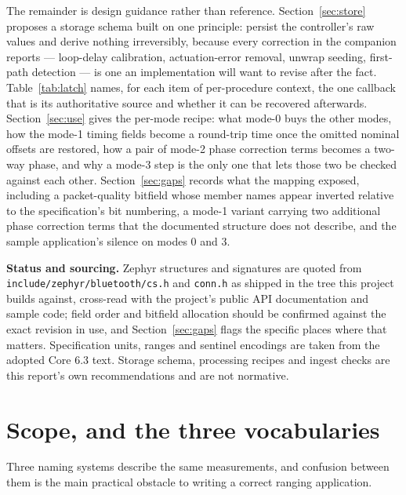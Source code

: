 \documentclass[11pt,a4paper]{article}
\newcommand{\code}[1]{\texttt{\small #1}}
\begin{document}
The remainder is design guidance rather than reference. Section~\ref{sec:store} proposes a storage
schema built on one principle: persist the controller's raw values and derive nothing irreversibly,
because every correction in the companion reports --- loop-delay calibration, actuation-error
removal, unwrap seeding, first-path detection --- is one an implementation will want to revise after
the fact. Table~\ref{tab:latch} names, for each item of per-procedure context, the one callback that
is its authoritative source and whether it can be recovered afterwards. Section~\ref{sec:use} gives the per-mode recipe: what mode-0 buys the other modes, how the
mode-1 timing fields become a round-trip time once the omitted nominal offsets are restored, how a
pair of mode-2 phase correction terms becomes a two-way phase, and why a mode-3 step is the only one
that lets those two be checked against each other. Section~\ref{sec:gaps} records what the mapping
exposed, including a packet-quality bitfield whose member names appear inverted relative to the
specification's bit numbering, a mode-1 variant carrying two additional phase correction terms that
the documented structure does not describe, and the sample application's silence on modes 0 and 3.

\begin{callout}
\textbf{Status and sourcing.} Zephyr structures and signatures are quoted from
\code{include/zephyr/bluetooth/cs.h} and \code{conn.h} as shipped in the tree this project builds
against, cross-read with the project's public API documentation and sample code; field order and
bitfield allocation should be confirmed against the exact revision in use, and
Section~\ref{sec:gaps} flags the specific places where that matters. Specification units, ranges and
sentinel encodings are taken from the adopted Core 6.3 text. Storage schema, processing recipes and
ingest checks are this report's own recommendations and are not normative.
\end{callout}

\newpage
\tableofcontents
\newpage
{}
\setcounter{page}{1}

\section{Scope, and the three vocabularies}

Three naming systems describe the same measurements, and confusion between them is the main
practical obstacle to writing a correct ranging application.
\end{document}

